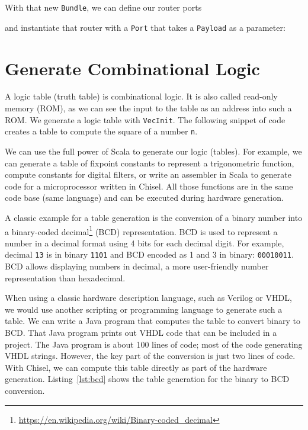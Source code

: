 \documentclass[%
    10pt,
    headinclude, footexclude,
    openright, %
    notitlepage,
    cleardoubleempty,
    headsepline,
    pointlessnumbers,
    bibtotoc, idxtotoc,
    ]{scrbook}
\newcommand{\code}[1]{{\small{\texttt{#1}}}}
\newcommand{\myref}[2]{\href{#1}{#2}}
\renewcommand{\myref}[2]{{#2}{\footnote{\url{#1}}}}
\begin{document}

\noindent With that new \code{Bundle}, we can define our router ports


\noindent and instantiate that router with a \code{Port} that takes
a \code{Payload} as a parameter:



\section{Generate Combinational Logic}
\label{sec:gen:comb:logic}

A logic table (truth table) is combinational logic. It is also called read-only memory (ROM),
as we can see the input to the table as an address into such a ROM.
We generate a logic table with \code{VecInit}.  The following snippet of code creates
a table to compute the square of a number \code{n}.


We can use the full power of Scala to generate our logic (tables).
For example, we can generate a table of fixpoint constants to represent a trigonometric function,
compute constants for digital filters, or write an assembler in Scala
to generate code for a microprocessor written in Chisel. All those functions
are in the same code base (same language) and can be executed during
hardware generation.

A classic example for a table generation is the conversion of a binary number
into a \myref{https://en.wikipedia.org/wiki/Binary-coded_decimal}{binary-coded decimal}
(BCD) representation. BCD is used to represent a number in a decimal
format using 4 bits for each decimal digit. For example, decimal \code{13} is in binary
\code{1101} and BCD encoded as 1 and 3 in binary: \code{00010011}.
BCD allows displaying numbers in decimal, a more user-friendly number
representation than hexadecimal.

When using a classic hardware description language, such as Verilog or VHDL,
we would use another scripting or programming language to generate such a table.
We can write a Java program that computes the table to convert binary to BCD.
That Java program prints out VHDL code that can be included in a project.
The Java program is about 100 lines of code; most of the code generating
VHDL strings. However, the key part of the conversion is just two lines of code.
With Chisel, we can compute this table directly as part of the hardware generation.
Listing~\ref{lst:bcd} shows the table generation for the binary to BCD conversion.
\end{document}
